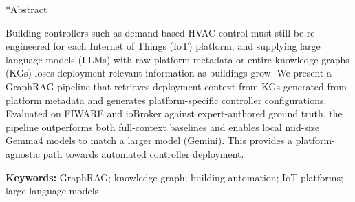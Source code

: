 \documentclass[twocolumn, 10pt, a4paper]{article}
\makeatletter
\renewcommand\section{\@startsection{section}{1}{\z@}{6pt}{3pt}{\normalfont\large\bfseries}}
\makeatother
\begin{document}
\setul{2pt}{0.25pt}
\section*{Abstract}

Building controllers such as demand-based HVAC control must still be re-engineered for each Internet of Things (IoT) platform, and supplying large language models (LLMs) with raw platform metadata or entire knowledge graphs (KGs) loses deployment-relevant information as buildings grow.
We present a GraphRAG pipeline that retrieves deployment context from KGs generated from platform metadata and generates platform-specific controller configurations.
Evaluated on FIWARE and ioBroker against expert-authored ground truth, the pipeline outperforms both full-context baselines and enables local mid-size Gemma4 models to match a larger model (Gemini).
This provides a platform-agnostic path towards automated controller deployment.


\vspace{0.5em}
\noindent\textbf{Keywords:} GraphRAG; knowledge graph; building automation; IoT platforms; large language models
\end{document}
